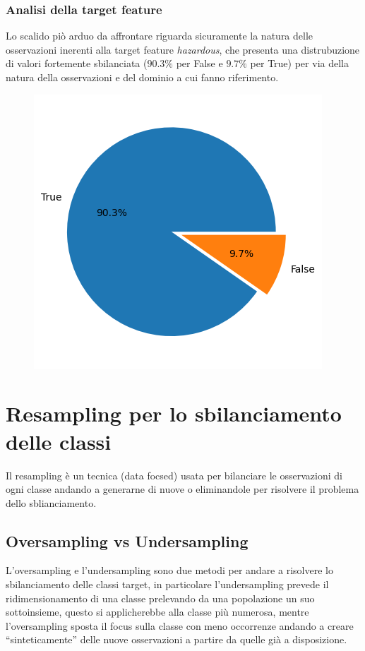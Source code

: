 \documentclass[italian,12pt,a4paper]{article}
\begin{document}
	
	\subsubsection{Analisi della target feature}
	Lo scalido piò arduo da affrontare riguarda sicuramente la natura delle osservazioni inerenti alla target feature \textit{hazardous}, che presenta una distrubuzione di valori fortemente sbilanciata ($90.3\%$ per False e $9.7\%$ per True) per via della natura della osservazioni e del dominio a cui fanno riferimento.
	
	\begin{center}
		\begin{figure}[!ht]
			\centering
			\includegraphics[scale=0.73]{output}
		\end{figure}
	\end{center}

	\section{Resampling per lo sbilanciamento delle classi}
	Il resampling è un tecnica (data focsed) usata per bilanciare le osservazioni di ogni classe andando a generarne di nuove o eliminandole per risolvere il problema dello sblianciamento.
	
	\subsection{Oversampling vs Undersampling}

	L’oversampling e l’undersampling sono due metodi per andare a risolvere lo sbilanciamento delle classi target, in particolare l’undersampling prevede il ridimensionamento di una classe prelevando da una popolazione un suo sottoinsieme, questo si applicherebbe alla classe più numerosa, mentre l’oversampling sposta il focus sulla classe con meno occorrenze andando a creare “sinteticamente” delle nuove osservazioni a partire da quelle già a disposizione.
	
\end{document}
